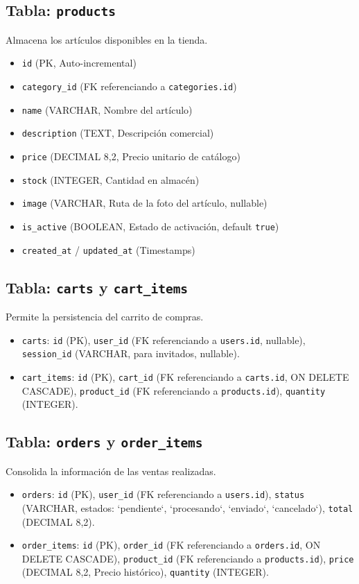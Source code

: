 \subsection{Tabla: \texttt{products}}
Almacena los artículos disponibles en la tienda.
\begin{itemize}
    \item \texttt{id} (PK, Auto-incremental)
    \item \texttt{category\_id} (FK referenciando a \texttt{categories.id})
    \item \texttt{name} (VARCHAR, Nombre del artículo)
    \item \texttt{description} (TEXT, Descripción comercial)
    \item \texttt{price} (DECIMAL 8,2, Precio unitario de catálogo)
    \item \texttt{stock} (INTEGER, Cantidad en almacén)
    \item \texttt{image} (VARCHAR, Ruta de la foto del artículo, nullable)
    \item \texttt{is\_active} (BOOLEAN, Estado de activación, default \texttt{true})
    \item \texttt{created\_at} / \texttt{updated\_at} (Timestamps)
\end{itemize}

\subsection{Tabla: \texttt{carts} y \texttt{cart\_items}}
Permite la persistencia del carrito de compras.
\begin{itemize}
    \item \texttt{carts}: \texttt{id} (PK), \texttt{user\_id} (FK referenciando a \texttt{users.id}, nullable), \texttt{session\_id} (VARCHAR, para invitados, nullable).
    \item \texttt{cart\_items}: \texttt{id} (PK), \texttt{cart\_id} (FK referenciando a \texttt{carts.id}, ON DELETE CASCADE), \texttt{product\_id} (FK referenciando a \texttt{products.id}), \texttt{quantity} (INTEGER).
\end{itemize}

\subsection{Tabla: \texttt{orders} y \texttt{order\_items}}
Consolida la información de las ventas realizadas.
\begin{itemize}
    \item \texttt{orders}: \texttt{id} (PK), \texttt{user\_id} (FK referenciando a \texttt{users.id}), \texttt{status} (VARCHAR, estados: `pendiente`, `procesando`, `enviado`, `cancelado`), \texttt{total} (DECIMAL 8,2).
    \item \texttt{order\_items}: \texttt{id} (PK), \texttt{order\_id} (FK referenciando a \texttt{orders.id}, ON DELETE CASCADE), \texttt{product\_id} (FK referenciando a \texttt{products.id}), \texttt{price} (DECIMAL 8,2, Precio histórico), \texttt{quantity} (INTEGER).
\end{itemize}


